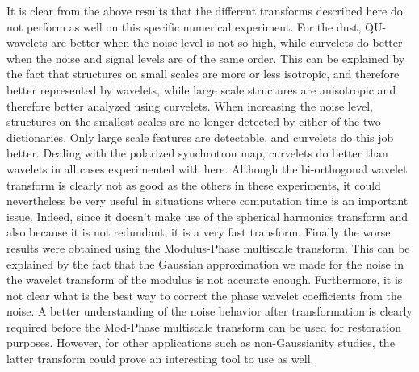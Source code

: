 It is clear from the above results that the different transforms described here do not perform as well 
on this specific numerical experiment. For the dust, QU-wavelets are better when the noise level is 
not so high, while curvelets do better when the noise and signal levels are of the same order. This can be 
explained by the fact that structures on small scales are more or less isotropic, and therefore better 
represented by wavelets, while large scale structures are anisotropic and therefore better analyzed 
using curvelets. When increasing the noise level, structures on the smallest scales are no longer detected 
by either of the two dictionaries. Only large scale features are detectable, and curvelets do this job better. 
Dealing with the polarized synchrotron map, curvelets do better than wavelets in all cases experimented with here. 
Although the bi-orthogonal wavelet transform is clearly not as good as the others in these experiments, 
it could nevertheless be very useful in situations where computation time is an important issue. Indeed, since it 
doesn't make use of the spherical harmonics transform and also because it is not redundant, it is a very fast transform.
Finally the worse results were obtained using the Modulus-Phase multiscale transform. This can be explained 
by the fact that the Gaussian approximation we made for the noise in the wavelet transform of the modulus 
is not accurate enough. Furthermore, it is not clear what is the best way to correct the phase wavelet 
coefficients from the noise. A better understanding of the noise behavior after transformation is clearly 
required before the Mod-Phase multiscale transform can be used for restoration purposes. However, for other 
applications such as non-Gaussianity studies, the latter transform could prove an interesting tool to use as well.








